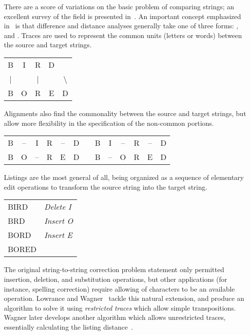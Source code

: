 There are a score of variations on the basic problem of
comparing strings; an excellent survey of the field is
presented in~\cite{Sankoff1999}.
An important concept emphasized in~\cite{Sankoff1999} is that
difference and distance analyses generally take one of
three forms: ,  and .
Traces are used to represent the common units (\eg letters or words)
between the source and target strings.
\begin{center}
  \begin{tabular}{c c c c c}
B & I & R & D & \\
| &   & | &   & $\!\!\!\!\!\!\!\!\!\!$\textbackslash \\
B & O & R & E & D \\
  \end{tabular}
\end{center}
Alignments also find the commonality between the source and target
strings, but allow more flexibility in the specification of
the non-common portions.
\begin{center}
  \begin{tabular}{c c c c c c c c c c c c c}
B & -- & I & R & -- & D & \qquad\qquad & B & I & -- & R & -- & D \\
B & O & -- & R & E & D & \qquad\qquad  & B & -- & O & R & E & D \\
  \end{tabular}
\end{center}
Listings are the most general of all, being
organized as a sequence of elementary edit operations
to transform the source string into the target string.
\begin{center}
  \begin{tabular}{l l}
  BIRD & \textit{Delete I} \\
  BRD & \textit{Insert O} \\
  BORD & \textit{Insert E} \\
  BORED & \\
  \end{tabular}
\end{center}

The original string-to-string correction problem statement
only permitted insertion, deletion, and substitution operations,
but other applications
(for instance, spelling correction) require allowing 
of characters to be an available operation.
Lowrance and Wagner~\cite{Lowrance1975} tackle this natural extension,
and produce an algorithm to solve it using \textit{restricted traces}
which allow simple transpositions.
Wagner later develops another algorithm which allows unrestricted
traces, essentially calculating the listing
distance~\cite{Wagner1975,Sankoff1999}.

